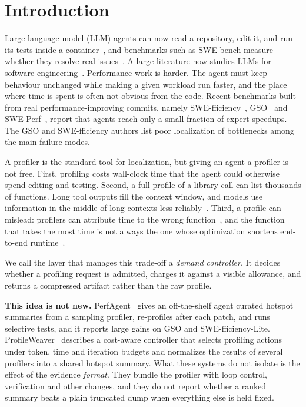 \documentclass[conference]{IEEEtran}
\begin{document}
\section{Introduction}

Large language model (LLM) agents can now read a repository, edit it, and run
its tests inside a container~\cite{yang2024sweagent,xia2024agentless}, and
benchmarks such as SWE-bench measure whether they resolve real
issues~\cite{jimenez2024swebench}. A large literature now studies LLMs for
software engineering~\cite{hou2024llm4se}.
Performance work is harder. The agent must keep behaviour unchanged while
making a given workload run faster, and the place where time is spent is
often not obvious from the code. Recent benchmarks built from real
performance-improving commits, namely SWE-fficiency~\cite{ma2025swefficiency},
GSO~\cite{shetty2025gso} and SWE-Perf~\cite{he2025sweperf}, report that agents
reach only a small fraction of expert speedups. The GSO and SWE-fficiency
authors list poor localization of bottlenecks among the main failure modes.

A profiler is the standard tool for localization, but giving an agent a
profiler is not free. First, profiling costs wall-clock time that the agent
could otherwise spend editing and testing. Second, a full profile of a library
call can list thousands of functions. Long tool outputs fill the context
window, and models use information in the middle of long contexts less
reliably~\cite{liu2024lost}. Third, a profile can mislead: profilers can
attribute time to the wrong function~\cite{mytkowicz2010evaluating}, and the
function that takes the most time is not always the one whose optimization
shortens end-to-end runtime~\cite{curtsinger2015coz}.

We call the layer that manages this trade-off a \emph{demand controller}. It
decides whether a profiling request is admitted, charges it against a visible
allowance, and returns a compressed artifact rather than the raw profile.

\textbf{This idea is not new.} PerfAgent~\cite{deng2026perfagent} gives an
off-the-shelf agent curated hotspot summaries from a sampling profiler,
re-profiles after each patch, and runs selective tests, and it reports large
gains on GSO and SWE-fficiency-Lite. ProfileWeaver~\cite{ding2026profileweaver}
describes a cost-aware controller that selects profiling actions under token,
time and iteration budgets and normalizes the results of several profilers
into a shared hotspot summary. What
these systems do not isolate is the effect of the evidence \emph{format}.
They bundle the profiler with loop control, verification and other changes,
and they do not report whether a ranked summary beats a plain truncated dump
when everything else is held fixed.
\end{document}
